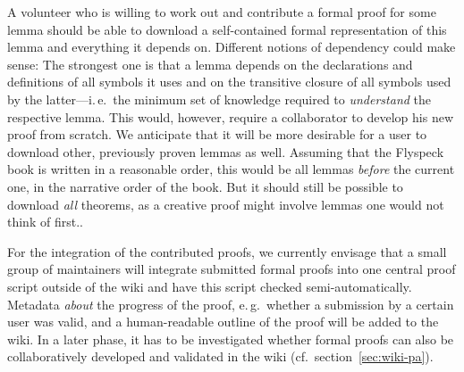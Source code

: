 \documentclass{llncs}
\begin{document}
A volunteer who is willing to work out and contribute a formal proof for some lemma should
be able to download a self-contained formal representation of this lemma and everything it
depends on.  Different notions of dependency could make sense: The strongest one is that a
lemma depends on the declarations and definitions of all symbols it uses and on the
transitive closure of all symbols used by the latter---i.\,e.\ the minimum set of
knowledge required to \emph{understand} the respective lemma.  This would, however,
require a collaborator to develop his new proof from scratch.  We anticipate that it will
be more desirable for a user to download other, previously proven
lemmas
as well.  Assuming that the Flyspeck book is written in a reasonable order,
this would be all lemmas \emph{before} the current one, in the narrative order of the
book.  But it should still be possible to download \emph{all} theorems, as a creative
proof might involve lemmas one would not think of first..

For the integration of the contributed proofs, we currently envisage that a small group of
maintainers will integrate submitted formal proofs into one central proof script outside
of the wiki and have this script checked semi-automatically.  Metadata \emph{about} the
progress of the proof, e.\,g.\ whether a submission by a certain user was valid, and a
human-readable outline of the proof will be added to the wiki.
In a later phase, it has to be investigated whether formal proofs can also be
collaboratively developed and validated in the wiki (cf.\ section~\ref{sec:wiki-pa}).
\end{document}
